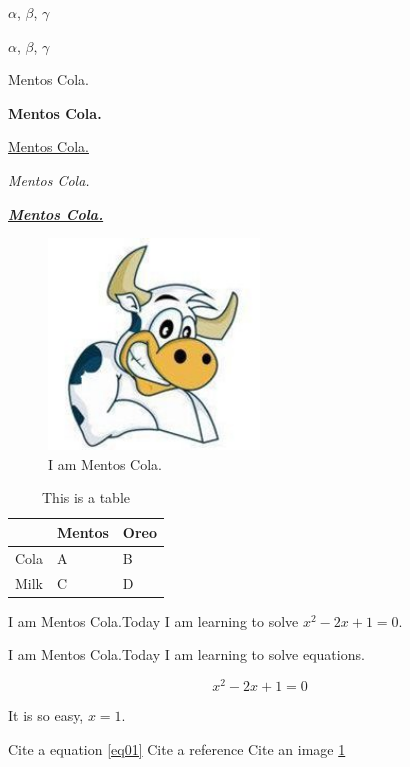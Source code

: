 \documentclass[pdflatex,sn-mathphys]{sn-jnl}%
\theoremstyle{thmstyleone}%
\theoremstyle{thmstyletwo}%
\theoremstyle{thmstylethree}%
\begin{document}
$\alpha$, $\beta$, $\gamma$

$\alpha$, $\beta$, $\gamma$

Mentos Cola.    %

\textbf{Mentos Cola.}    %

\underline{Mentos Cola.}    %

\textit{Mentos Cola.}   %

\underline{\textbf{\textit{Mentos Cola.}}}  %

\begin{figure}[h]%
\centering
\includegraphics[width=0.5\textwidth]{fig01.jpg}        
\caption{I am Mentos Cola.}\label{fig01}
\end{figure}

\begin{table}[h]
\begin{center}
\caption{This is a table}\label{tab01}  
\begin{tabular}{lll}
\hline
     & Mentos & Oreo \\ \hline
Cola & A      & B    \\
Milk & C      & D    \\ \hline
\end{tabular}
\end{center}
\end{table}

I am Mentos Cola.Today I am learning to solve ${x^2} - 2x + 1 = 0$. 

I am Mentos Cola.Today I am learning to solve equations.

\begin{equation}
{x^2} - 2x + 1 = 0 \label{eq01}
\end{equation}

It is so easy, $x = 1$.

Cite a equation \ref{eq01} 
Cite a reference \cite{bib1} 
Cite an image \ref{fig01}

\end{document}
